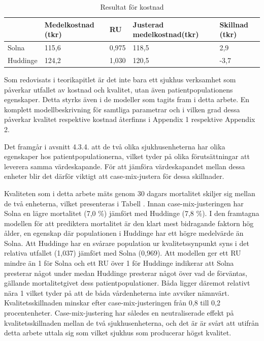 \begin{table}[h]
\centering
\caption{Resultat för kostnad}
\label{tab:kostres}
\begin{tabular}{|p{2cm}|p{3cm}|p{1cm}|p{4cm}|p{2cm}|}
\hline
         & Medelkostnad (tkr) & RU    & Justerad medelkostnad\newline (tkr) & Skillnad (tkr) \\ \hline
Solna    & 115,6              & 0,975 & 118,5                       & 2,9            \\ \hline
Huddinge & 124,2              & 1,030 & 120,5                       & -3,7           \\ \hline
\end{tabular}
\end{table}

Som redovisats i teorikapitlet är det inte bara ett sjukhus verksamhet som påverkar utfallet av kostnad och kvalitet, utan även patientpopulationens egenskaper. Detta styrks även i de modeller som tagits fram i detta arbete. En komplett modellbeskrivning för samtliga parametrar och i vilken grad dessa påverkar kvalitet respektive kostnad återfinns i Appendix 1 respektive Appendix 2.

Det framgår i avsnitt 4.3.4. att de två olika sjukhusenheterna har olika egenskaper hos patientpopulationerna, vilket tyder på olika förutsättningar att leverera samma värdeskapande. För att jämföra värdeskapandet mellan dessa enheter blir det därför viktigt att case-mix-justera för dessa skillnader.

Kvaliteten som i detta arbete mäts genom 30 dagars mortalitet skiljer sig mellan de två enheterna, vilket presenteras i Tabell \label{tab:kvalres}. Innan case-mix-justeringen har Solna en lägre mortalitet (7,0 \%) jämfört med Huddinge (7,8 \%). I den framtagna modellen för att prediktera mortalitet är den klart mest bidragande faktorn hög ålder, en egenskap där populationen i Huddinge har ett högre medelvärde än Solna. Att Huddinge har en svårare population ur kvalitetssynpunkt syns i det relativa utfallet (1,037) jämfört med Solna (0,969). Att modellen ger ett RU mindre än 1 för Solna och ett RU över 1 för Huddinge indikerar att Solna presterar något under medan Huddinge presterar något över vad de förväntas, gällande mortalitetgivet dess patientpopulationer. Båda ligger däremot relativt nära 1 vilket tyder på att de båda vårdenheterna inte avviker nämnvärt. Kvalitetsskillnaden minskar efter case-mix-justeringen från 0,8 till 0,2 procentenheter. Case-mix-justering har således en neutraliserade effekt på kvalitetsskillnaden mellan de två sjukhusenheterna, och det är är svårt att utifrån detta arbete uttala sig som vilket sjukhus som producerar högst kvalitet. 

